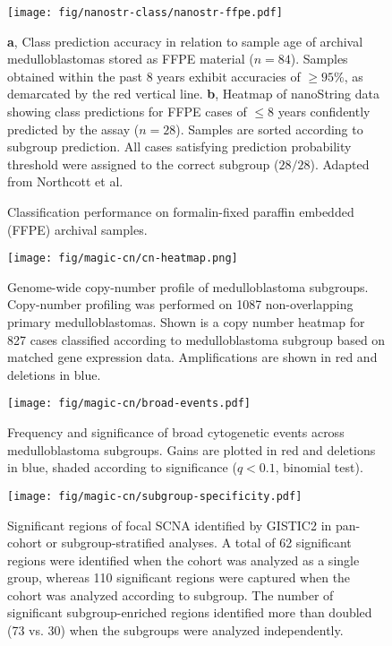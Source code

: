 \documentclass[11pt,letterpaper]{article}
\theoremstyle{definition}
\begin{document}
\begin{figure}[h]
	\begin{center}
		\texttt{[image: fig/nanostr-class/nanostr-ffpe.pdf]}
	\end{center}
	\caption{Classification performance on formalin-fixed paraffin embedded (FFPE) archival samples.}
	\textbf{a}, Class prediction accuracy in relation to sample age of archival medulloblastomas stored as FFPE material ($n = 84$). Samples obtained within the past 8 years exhibit accuracies of $\geq 95\%$, as demarcated by the red vertical line. \textbf{b}, Heatmap of nanoString data showing class predictions for FFPE cases of $\leq 8$ years confidently predicted by the assay ($n = 28$). Samples are sorted according to subgroup prediction. All cases satisfying prediction probability threshold were assigned to the correct subgroup ($28/28$). Adapted from Northcott et al.
	\label{fig:nanostr-ffpe}
\end{figure}

\clearpage

\begin{SCfigure}
	\centering
	\texttt{[image: fig/magic-cn/cn-heatmap.png]}
	\caption{Genome-wide copy-number profile of medulloblastoma subgroups.
	Copy-number profiling was performed on 1087 non-overlapping primary medulloblastomas. Shown is a copy number heatmap for 827 cases classified according to medulloblastoma subgroup based on matched gene expression data.  Amplifications are shown in red and deletions in blue.}
	\label{fig:cn-heatmap}
\end{SCfigure}

\begin{SCfigure}
	\centering
	\texttt{[image: fig/magic-cn/broad-events.pdf]}
	\caption{Frequency and significance of broad cytogenetic events across medulloblastoma subgroups.
	Gains are plotted in red and deletions in blue, shaded according to significance ($q < 0.1$, binomial test).}
	\label{fig:broad-events}
\end{SCfigure} 


\clearpage

\begin{SCfigure}
	\centering
	\texttt{[image: fig/magic-cn/subgroup-specificity.pdf]}
	\caption{Significant regions of focal SCNA identified by GISTIC2 in pan-cohort or subgroup-stratified analyses.
	A total of 62 significant regions were identified when the cohort was analyzed as a single group, whereas 110 significant regions were captured when the cohort was analyzed according to subgroup. The number of significant subgroup-enriched regions identified more than doubled (73 vs. 30) when the subgroups were analyzed independently.}
	\label{fig:subgroup-specificity}
\end{SCfigure}
\end{document}
